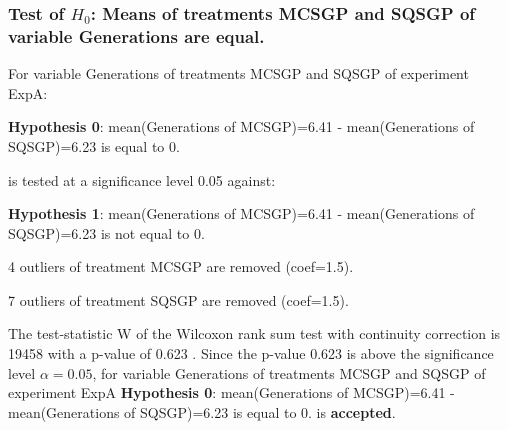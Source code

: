 \begin{frame}[t]
 \frametitle{Test of $H_{0}$: Means of treatments MCSGP and SQSGP of variable Generations are equal. }
 \scriptsize
 For variable Generations of treatments MCSGP and SQSGP of experiment ExpA:

\vspace{1mm}
{\bf Hypothesis 0}: mean(Generations of MCSGP)=6.41 - mean(Generations of SQSGP)=6.23 is equal to 0.


 \begin{center} is tested at a significance level 0.05 against: \end{center}

{\bf Hypothesis 1}: mean(Generations of MCSGP)=6.41 - mean(Generations of SQSGP)=6.23 is not equal to 0.
\vspace{1mm}
\vspace{1mm}

 4 outliers of treatment MCSGP are removed (coef=1.5).

 7 outliers of treatment SQSGP are removed (coef=1.5).
\vspace{1mm}
 
 The test-statistic W of the Wilcoxon rank sum test with continuity correction is 19458 with a p-value of 0.623 .
 Since the p-value 0.623 is above the significance level $\alpha= 0.05 $,
 for variable Generations of treatments MCSGP and SQSGP of experiment ExpA 
 {\bf Hypothesis 0}: mean(Generations of MCSGP)=6.41 - mean(Generations of SQSGP)=6.23 is equal to 0.
is {\bf accepted}.

 \end{frame}
